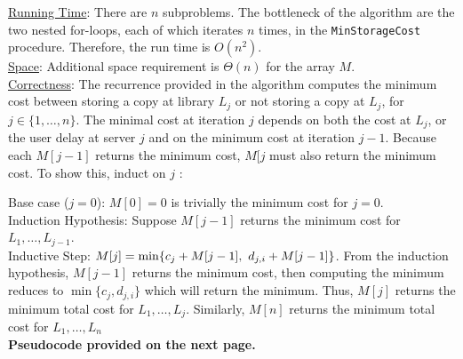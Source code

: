 \documentclass[twoside,11pt]{homework}
\begin{document}

\noindent

\noindent
\underline{Running Time}:  There are $n$ subproblems. The bottleneck of the algorithm are the two nested for-loops, each of which iterates $n$ times, in the \texttt{MinStorageCost} procedure.  Therefore,  the run time is $O(n^2)$.  \\

\noindent
\underline{Space}:  Additional space requirement is $\Theta(n)$ for the array $M$.  \\

\noindent
\underline{Correctness}:  The recurrence provided in the algorithm computes the minimum cost between storing a copy at library $L_j$ or not storing a copy at $L_j$, for $j \in \{1, \dots, n\}$.  The minimal cost at iteration $j$ depends on both the cost at $L_j$, or the user delay at server $j$ and on the minimum cost at iteration $j-1$.  Because each $M[j-1]$ returns the minimum cost, $M[j$ must also return the minimum cost.  To show this,  induct on $j$ :

\noindent
Base case ($j = 0$):  $M[0] = 0$ is trivially the minimum cost for $j=0$.  \\
Induction Hypothesis:  Suppose $M[j-1]$ returns the minimum cost for $L_1, \dots, L_{j-1}$. \\
Inductive Step:  $M[j] = \mathlarger{\min \{c_j + M[j-1], \ d_{j, i} + M[j-1] \} }$.  From the induction hypothesis, $M[j-1]$ returns the minimum cost, then computing the minimum reduces to $\min \{c_j, d_{j, i}\}$ which will return the minimum. Thus, $M[j]$ returns the minimum total cost for $L_1, \dots , L_j$.  Similarly, $M[n]$ returns the minimum total cost for $L_1, \dots , L_n$ \\

\noindent
\textbf{Pseudocode provided on the next page.}
\end{document}
